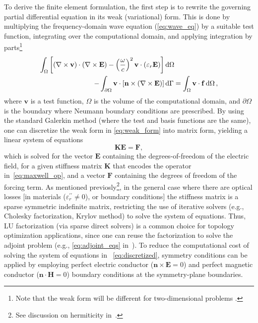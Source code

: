  To derive the finite element formulation, the first step is to rewrite the governing partial differential equation in its weak (variational) form. This is done by multiplying the frequency-domain wave equation (\eqref{eq:wave_eq}) by a suitable test function, integrating over the computational domain, and applying integration by parts\footnote{Note that the weak form will be different for two-dimensional problems \cite{ownpub0, ownpub2}.}
    \begin{align}\label{eq:weak_form}
        \int_\Omega \left[ \left( \nabla \times \mathbf{v} \right) \cdot \left( \nabla \times \mathbf{E} \right)- \left(\frac{\omega}{c}\right)^2 \mathbf{v}\cdot(\varepsilon_r \mathbf{E})\right]& \mathop{}\!\text{d} \Omega \nonumber \\ 
 - \int_{\partial \Omega} \mathbf{v} \cdot \left[ \mathbf{n} \times \left( \nabla \times \mathbf{E} \right) \right]& \mathop{}\!\text{d} \Gamma 
 = \int_\Omega \mathbf{v} \cdot \mathbf{f} \mathop{}\!\text{d} \Omega\,,
    \end{align}
 where $\mathbf{v}$ is a test function, $\Omega$ is the volume of the computational domain,
 and $\partial \Omega$ is the boundary where Neumann boundary conditions
 are prescribed. By using
 the standard Galerkin method (where the test and basis functions are the same),
 one can discretize the weak form in \eqref{eq:weak_form} 
 into matrix form, yielding a linear system of equations
    \begin{equation}\label{eq:discretized}
 \mathbf{K} \mathbf{E} = \mathbf{F},
    \end{equation}
 which is solved for the vector $\mathbf{E}$ containing the degrees-of-freedom of the electric field, for a given stiffness matrix $\mathbf{K}$ that encodes the operator 
 in~\eqref{eq:maxwell_op}, and a 
 vector $\mathbf{F}$ containing the degrees of freedom of the forcing term. As mentioned previosly\footnote{See discussion on hermiticity
 in~.}, in the general case where there are optical losses [in materials ($\varepsilon_r^{\prime \prime} \neq 0$), or boundary conditions] the stiffness matrix is a sparse symmetric indefinite matrix,
 restricting the use of iterative solvers
 (e.g., Cholesky factorization, Krylov method) to solve the system of equations.
 Thus, LU factorization (via sparse direct solvers) is
 a common choice for topology optimization applications, since one can reuse the factorization to solve
 the adjoint problem (e.g., \eqref{eq:adjoint_eqs} in~). To reduce the computational cost of solving the system of equations in~
 \eqref{eq:discretized}, symmetry conditions can be applied by employing perfect electric conductor ($\mathbf{n} \times \mathbf{E}=0$) and perfect
 magnetic
 conductor ($\mathbf{n} \cdot \mathbf{H}=0$) boundary conditions at the symmetry-plane boundaries.


